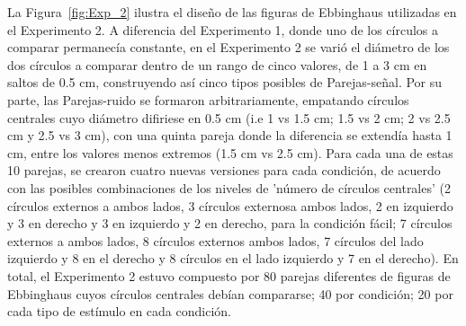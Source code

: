 \begin{itemize}
La Figura~\ref{fig:Exp_2} ilustra el diseño de las figuras de Ebbinghaus utilizadas en el Experimento 2. A diferencia del Experimento 1, donde uno de los círculos a comparar permanecía constante, en el Experimento 2 se varió el diámetro de los dos círculos a comparar dentro de un rango de cinco valores, de 1 a 3 cm en saltos de 0.5 cm, construyendo así cinco tipos posibles de Parejas-señal. Por su parte, las Parejas-ruido se formaron arbitrariamente, empatando círculos centrales cuyo diámetro difiriese en 0.5 cm (i.e 1 vs 1.5 cm; 1.5 vs 2 cm; 2 vs 2.5 cm y 2.5 vs 3 cm), con una quinta pareja donde la diferencia se extendía hasta 1 cm, entre los valores menos extremos (1.5 cm vs 2.5 cm). Para cada una de estas 10 parejas, se crearon cuatro nuevas versiones para cada condición, de acuerdo con las posibles combinaciones de los niveles de 'número de círculos centrales' (2 círculos externos a ambos lados, 3 círculos externosa ambos lados, 2 en izquierdo y 3 en derecho y 3 en izquierdo y 2 en derecho, para la condición fácil; 7 círculos externos a ambos lados, 8 círculos externos ambos lados, 7 círculos del lado izquierdo y 8 en el derecho y 8 círculos en el lado izquierdo y 7 en el derecho). En total, el Experimento 2 estuvo compuesto por 80 parejas diferentes de figuras de Ebbinghaus cuyos círculos centrales debían compararse; 40 por condición; 20 por cada tipo de estímulo en cada condición.\\


\end{itemize}
